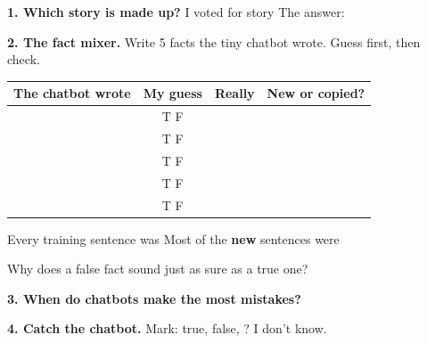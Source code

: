 \documentclass[11pt]{article}
\begin{document}
\partner


\vspace{0.4em}
{\large\textbf{1. Which story is made up?}} I voted for story \ansline{0.5in}{} \quad The answer: 

\vspace{1.0em}
{\large\textbf{2. The fact mixer.}} Write 5 facts the tiny chatbot wrote. Guess first, then check.

\vspace{0.3em}
\begin{tabular}{|R{3.4in}|c|c|c|}
\hline
\textbf{The chatbot wrote} & \textbf{My guess} & \textbf{Really} & \textbf{New or copied?} \\ \hline
{} & T \quad F &  &  \\[0.3em] \hline
 & T \quad F & & \\[0.3em] \hline
 & T \quad F & & \\[0.3em] \hline
 & T \quad F & & \\[0.3em] \hline
 & T \quad F & & \\[0.3em] \hline
\end{tabular}

\vspace{0.6em}
Every training sentence was  Most of the \textbf{new} sentences were 

\vspace{0.6em}
Why does a false fact sound just as sure as a true one? 

\vspace{0.4em}

\vspace{1.0em}
{\large\textbf{3. When do chatbots make the most mistakes?}}

\vspace{0.5em}
 \quad {}

\vspace{0.6em}
 \quad {}

\newpage

{\large\textbf{4. Catch the chatbot.}} Mark:  true,  false, ? I don't know.
\end{document}

